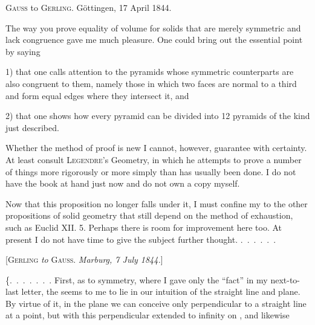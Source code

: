 %
\begin{center}
\textsc{Gauss} to \textsc{Gerling.} Göttingen, 17 April 1844.
\end{center}

The way you prove equality of volume for solids that are merely symmetric and lack congruence gave me much pleasure. One could bring out the essential point by saying

1) that one calls attention to the pyramids whose symmetric counterparts are also congruent to them, namely those in which two faces are normal to a third and form equal edges where they intersect it, and

2) that one shows how every pyramid can be divided into 12 pyramids of the kind just described.

Whether the method of proof is new I cannot, however, guarantee with certainty. At least consult \textsc{Legendre}'s Geometry, in which he attempts to prove a number of things more rigorously or more simply than has usually been done. I do not have the book at hand just now and do not own a copy myself.

Now that this proposition no longer falls under it, I must confine my  to the other propositions of solid geometry that still depend on the method of exhaustion, such as Euclid XII. 5. Perhaps there is room for improvement here too. At present I do not have time to give the subject further thought. \mbox{.\ .\ .\ .\ .\ .}

\begin{center}
[\textsc{Gerling} \emph{to} \textsc{Gauss}. \emph{Marburg, 7 July 1844.}]
\end{center}

\{\mbox{.\ .\ .\ .\ .\ .\ .} First, as to symmetry, where I gave only the “fact” in my next-to-last letter, the  seems to me to lie in our intuition of the straight line and plane. By virtue of it, in the plane we can conceive only  perpendicular to a straight line at a point, but with this perpendicular extended to infinity on , and likewise\space%
